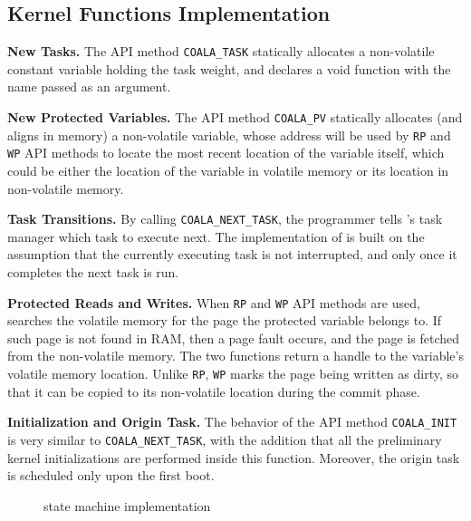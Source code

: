 \subsection{Kernel Functions Implementation}

\textbf{New Tasks.} The API method \texttt{COALA\_TASK} statically allocates a non-volatile constant variable holding the task weight, and declares a void function with the name passed as an argument.

\textbf{New Protected Variables.} The API method \texttt{COALA\_PV} statically allocates (and aligns in memory) a non-volatile variable, whose address will be used by \texttt{RP} and \texttt{WP} API methods to locate the most recent location of the variable itself, which could be either the location of the variable in volatile memory or its location in non-volatile memory.

\textbf{Task Transitions.} By calling \texttt{COALA\_NEXT\_TASK}, the programmer tells \sys's task manager which task to execute next. The implementation of \sys is built on the assumption that the currently executing task is not interrupted, and only once it completes the next task is run.

\textbf{Protected Reads and Writes.} When \texttt{RP} and \texttt{WP} API methods are used, \sys searches the volatile memory for the page the protected variable belongs to. If such page is not found in RAM, then a page fault occurs, and the page is fetched from the non-volatile memory. The two functions return a handle to the variable's volatile memory location. Unlike \texttt{RP}, \texttt{WP} marks the page being written as dirty, so that it can be copied to its non-volatile location during the commit phase.

\textbf{Initialization and Origin Task.} The behavior of the API method \texttt{COALA\_INIT} is very similar to \texttt{COALA\_NEXT\_TASK}, with the addition that all the preliminary kernel initializations are performed inside this function. Moreover, the origin task is scheduled only upon the first boot.

\begin{figure}
	\centering
	\caption{\sys state machine implementation }
	\label{fig:coala_state_machine}
\end{figure}

